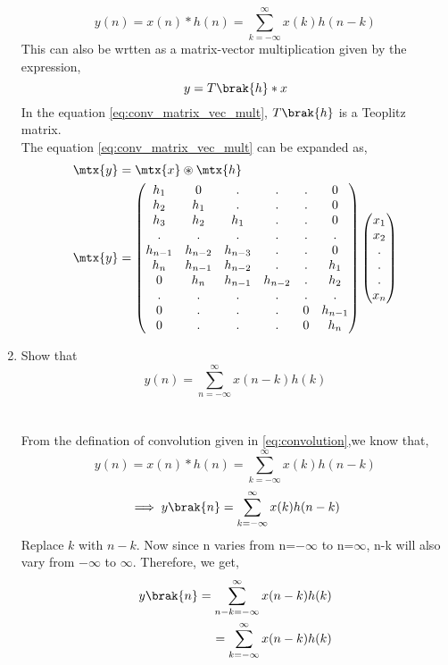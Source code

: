 \documentclass[journal,12pt,twocolumn]{IEEEtran}
\renewcommand\thesection{\arabic{section}}
\begin{document}
\begin{enumerate}[label=\thesection.\arabic*]
\begin{equation}
	y(n) = x(n)*h(n) = \sum_{k=-\infty}^{\infty}x(k)h(n-k)
\end{equation}
This can also be wrtten as a matrix-vector multiplication given by the expression,
\begin{equation}
	\label{eq:conv_matrix_vec_mult}
	y = T\brak{h}*x
\end{equation}
In the equation \eqref{eq:conv_matrix_vec_mult}, $T\brak{h}$ is a Teoplitz matrix.
\\ The equation \eqref{eq:conv_matrix_vec_mult} can be expanded as,
\begin{align}
	\mtx{y} &= \mtx{x} \circledast \mtx{h}\\
	\mtx{y} &= 
	\begin{pmatrix}
		h_1 & 0 & . & . & . & 0 \\
		h_2 & h_1 & . & . & . & 0 \\
		h_3 & h_2 & h_1 & . & . & 0 \\
		. & . & . & . & . & . \\
		h_{n-1} & h_{n-2} & h_{n-3} & . & . & 0\\
		h_{n} & h_{n-1} & h_{n-2} & . & . & h_1\\
		0 & h_{n} & h_{n-1} & h_{n-2} & . & h_2\\
		. & . & . & . & . & . \\
		0 & . & . & . & 0 & h_{n-1} \\
		0 & . & . & . & 0 & h_n \\
	\end{pmatrix}
	\begin{pmatrix}
		x_1 \\ x_2 \\ .\\.\\. \\ x_n
	\end{pmatrix}
\end{align}
\item Show that
\begin{equation}
y(n) =  \sum_{n=-\infty}^{\infty}x(n-k)h(k)
\end{equation}
\\\solution\\
From the defination of convolution given in \eqref{eq:convolution},we know that,
\begin{equation}
	y(n) = x(n)*h(n) = \sum_{k=-\infty}^{\infty}x(k)h(n-k)
\end{equation}
\begin{align}
	\implies y\brak{n} = \sum_{k=-\infty}^{\infty}x(k)h(n-k)
\end{align}
Replace $k$ with $n-k$. Now since n varies from n=$-\infty$ to n=$\infty$, n-k will also vary from $-\infty$ to $\infty$. Therefore, we get,
\begin{align}
	y\brak{n} = \sum_{n-k=-\infty}^{\infty}x(n-k)h(k)	
	\\=\sum_{k=-\infty}^{\infty}x(n-k)h(k)
\end{align}
\end{enumerate}
%
\end{document}
